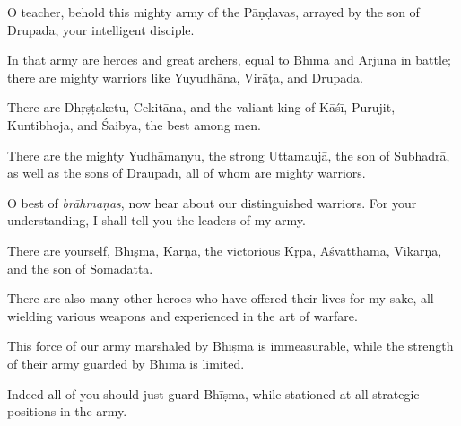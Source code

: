 {O teacher, behold this mighty army of the Pāṇḍavas, arrayed by the son of Drupada, your intelligent disciple.}

{In that army are heroes and great archers, equal to Bhīma and Arjuna in battle; there are mighty warriors like Yuyudhāna, Virāṭa, and Drupada.}

{There are Dhṛṣṭaketu, Cekitāna, and the valiant king of Kāśī, Purujit, Kuntibhoja, and Śaibya, the best among men.}

{There are the mighty Yudhāmanyu, the strong Uttamaujā, the son of Subhadrā, as well as the sons of Draupadī, all of whom are mighty warriors.}

{O best of \textit{brāhmaṇas}, now hear about our distinguished warriors. For your understanding, I shall tell you the leaders of my army.}

{There are yourself, Bhīṣma, Karṇa, the victorious Kṛpa, Aśvatthāmā, Vikarṇa, and the son of Somadatta.}

{There are also many other heroes who have offered their lives for my sake, all wielding various weapons and experienced in the art of warfare.}

{This force of our army marshaled by Bhīṣma is immeasurable, while the strength of their army guarded by Bhīma is limited.}

{Indeed all of you should just guard Bhīṣma, while stationed at all strategic positions in the army.}

